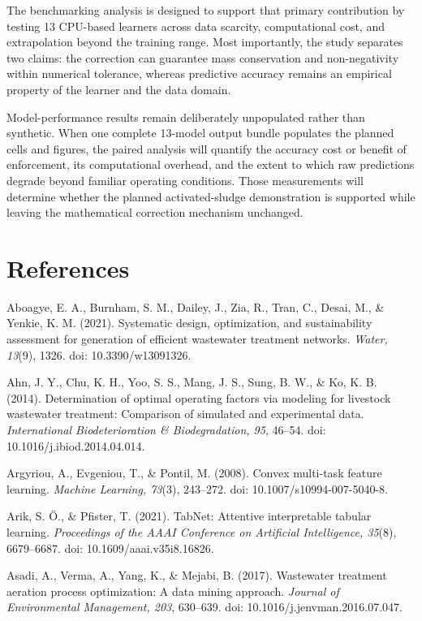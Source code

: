 \documentclass[a4paper,fleqn]{cas-sc}
\begin{document}
The benchmarking analysis is designed to support that primary contribution by testing 13 CPU-based learners across data scarcity, computational cost, and extrapolation beyond the training range. Most importantly, the study separates two claims: the correction can guarantee mass conservation and non-negativity within numerical tolerance, whereas predictive accuracy remains an empirical property of the learner and the data domain.

Model-performance results remain deliberately unpopulated rather than synthetic. When one complete 13-model output bundle populates the planned cells and figures, the paired analysis will quantify the accuracy cost or benefit of enforcement, its computational overhead, and the extent to which raw predictions degrade beyond familiar operating conditions. Those measurements will determine whether the planned activated-sludge demonstration is supported while leaving the mathematical correction mechanism unchanged.

\section*{References}

\noindent Aboagye, E. A., Burnham, S. M., Dailey, J., Zia, R., Tran, C., Desai, M., \& Yenkie, K. M. (2021). Systematic design, optimization, and sustainability assessment for generation of efficient wastewater treatment networks. \textit{Water, 13}(9), 1326. doi: 10.3390/w13091326.

\noindent Ahn, J. Y., Chu, K. H., Yoo, S. S., Mang, J. S., Sung, B. W., \& Ko, K. B. (2014). Determination of optimal operating factors via modeling for livestock wastewater treatment: Comparison of simulated and experimental data. \textit{International Biodeterioration \& Biodegradation, 95}, 46--54. doi: 10.1016/j.ibiod.2014.04.014.

\noindent Argyriou, A., Evgeniou, T., \& Pontil, M. (2008). Convex multi-task feature learning. \textit{Machine Learning, 73}(3), 243--272. doi: 10.1007/s10994-007-5040-8.

\noindent Arik, S. \"O., \& Pfister, T. (2021). TabNet: Attentive interpretable tabular learning. \textit{Proceedings of the AAAI Conference on Artificial Intelligence, 35}(8), 6679--6687. doi: 10.1609/aaai.v35i8.16826.

\noindent Asadi, A., Verma, A., Yang, K., \& Mejabi, B. (2017). Wastewater treatment aeration process optimization: A data mining approach. \textit{Journal of Environmental Management, 203}, 630--639. doi: 10.1016/j.jenvman.2016.07.047.
\end{document}
